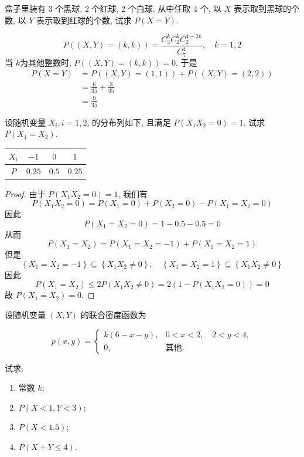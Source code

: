 \documentclass[../main.tex]{subfiles}
\begin{document}
\begin{exercise}{}{}
盒子里装有 3 个黑球, 2 个红球, 2 个白球, 从中任取 4 个, 以 $X$ 表示取到黑球的个数, 以 $Y$ 表示取到红球的个数, 试求 $P(X = Y)$.
\end{exercise}

\begin{solution}
   \[
   P\left( \left( X,Y \right)= \left( k,k \right)   \right)= \frac{C_{3}^{k} C_{2}^{k} C_{2}^{4-2k} }{C_{7}^{4} },\quad k= 1,2  
   \]当 \(  k  \)为其他整数时,  \(  P\left( \left( X,Y \right)= \left( k,k \right)   \right)= 0   \). 于是 \[
   \begin{aligned}
   P\left( X= Y \right)&= P\left( \left( X,Y \right)= \left( 1,1 \right)   \right)+ P\left( \left( X,Y \right)= \left( 2,2 \right)   \right) \\ 
    &=  \frac{ 6}{35 }+ \frac{ 3}{35 }\\ 
     &= \frac{9 }{35 }   
   \end{aligned}  
   \]  
\end{solution}

\begin{exercise}{}{}
设随机变量 $X_i, i=1,2$, 的分布列如下, 且满足 $P(X_1X_2=0)=1$, 试求 $P(X_1=X_2)$.

\begin{center}
\begin{tabular}{c|ccc}
$X_i$ & $-1$ & $0$ & $1$ \\
\hline
$P$ & $0.25$ & $0.5$ & $0.25$
\end{tabular}
\end{center}
\end{exercise}
\begin{proof}
  由于 \(  P\left( X_1X_2= 0 \right)= 1   \), 我们有 \[
  P\left( X_1X_2= 0 \right)= P\left( X_1= 0 \right)+ P\left( X_2= 0 \right)   -P\left( X_1= X_2= 0 \right) 
  \]因此 \[
  P\left( X_1= X_2= 0 \right)= 1-0.5-0.5= 0 
  \]从而 \[
  P\left( X_1= X_2 \right)= P\left( X_1= X_2= -1 \right)+ P\left( X_1= X_2= 1 \right)   
  \]但是 \[
  \left\{ X_1= X_2= -1 \right\}\subseteq \left\{ X_1X_2\neq 0 \right\},\quad \left\{ X_1= X_2= 1 \right\}\subseteq \left\{ X_1X_2\neq 0 \right\}
  \]因此 \[
  P\left( X_1= X_2 \right)\le 2 P\left( X_1X_2\neq 0 \right)= 2\left( 1-P\left( X_1X_2= 0 \right)  \right)= 0  
  \]故 \(  P\left( X_1= X_2 \right)= 0   \). 
\end{proof}
\begin{exercise}{}{}
设随机变量 $(X,Y)$ 的联合密度函数为

\[
p(x,y) = \begin{cases}
k(6-x-y), & 0 < x < 2, \quad 2 < y < 4, \\
0, & \text{其他}.
\end{cases}
\]

试求:

\begin{enumerate}
\item 常数 $k$;
\item $P(X<1, Y<3)$;
\item $P(X<1.5)$;
\item $P(X+Y \leqslant 4)$.
\end{enumerate}
\end{exercise}
\end{document}
